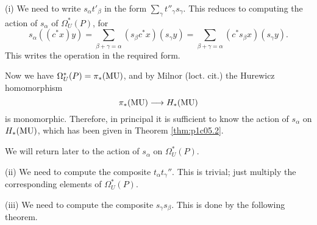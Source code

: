 \documentclass[../main]{subfiles}
\begin{document}
(i) We need to write $s_\alpha t'_\beta$ in the form $\sum_\gamma t''_\gamma s_\gamma$. This reduces to computing the action of $s_\alpha$ of $\Omega_U^*(P)$, for
\[s_\alpha((c^* x)y) = \sum_{\beta  + \gamma = \alpha} (s_\beta c^* x)(s_\gamma y) = \sum_{\beta  + \gamma = \alpha} (c^* s_\beta x)(s_\gamma y) .\]
This writes the operation in the required form.

Now we have $\Omega_U^*(P) = \pi_*(\mathrm{MU})$, and by Milnor (loct. cit.) the Hurewicz homomorphism
\[\pi_*(\mathrm{MU}) \longrightarrow H_*(\mathrm{MU})\]
is monomorphic. Therefore, in principal it is sufficient to know the action of $s_\alpha$ on $H_*(\mathrm{MU})$, which has been given in Theorem \ref{thm:p1c05.2}.

We will return later to the action of $s_\alpha$ on $\Omega_U^*(P)$.

(ii) We need to compute the composite $t_\alpha t_\gamma ''$. This is trivial; just multiply the corresponding elements of $\Omega_U^*(P)$.

(iii) We need to compute the composite $s_\gamma s_\beta$. This is done by the following theorem.
\end{document}
